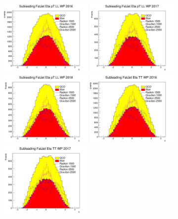 \begin{figure}[!htb]
	\centering
	\includegraphics[width=0.4\textwidth]{Figures/eta1LL_16_deepTagMD_HbbvsQCD.png}
	\includegraphics[width=0.4\textwidth]{Figures/eta1LL_17_deepTagMD_HbbvsQCD.png}
	\includegraphics[width=0.4\textwidth]{Figures/eta1LL_18_deepTagMD_HbbvsQCD.png}
	\includegraphics[width=0.4\textwidth]{Figures/eta1TT_16_deepTagMD_HbbvsQCD.png}
	\includegraphics[width=0.4\textwidth]{Figures/eta1TT_17_deepTagMD_HbbvsQCD.png}

\end{figure}
